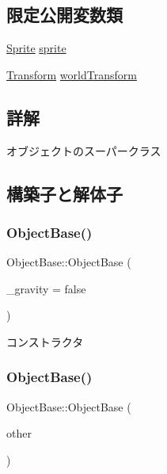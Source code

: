 \subsection*{限定公開変数類}
\begin{DoxyCompactItemize}
\item 
\mbox{\hyperlink{class_sprite}{Sprite}} \mbox{\hyperlink{class_object_base_a16415e349623e10f45518fb637f7051b}{sprite}}
\item 
\mbox{\hyperlink{common_8h_a1c43cb8f0d8a41901f3ce4c67dbbce20}{Transform}} \mbox{\hyperlink{class_object_base_abedc2ea4baa694611f8822ea6e04b210}{world\+Transform}}
\end{DoxyCompactItemize}


\subsection{詳解}
オブジェクトのスーパークラス 

\subsection{構築子と解体子}
\mbox{\label{class_object_base_a8567572c8f524465f9c70cabdb603637}} 
\subsubsection{\texorpdfstring{Object\+Base()}{ObjectBase()}\hspace{0.1cm}{\footnotesize\ttfamily [1/2]}}
{\footnotesize\ttfamily Object\+Base\+::\+Object\+Base (\begin{DoxyParamCaption}\item[{bool}]{\+\_\+gravity = {\ttfamily false} }\end{DoxyParamCaption})\hspace{0.3cm}{\ttfamily [inline]}}



コンストラクタ 

\mbox{\label{class_object_base_ace25225cee2f693b3b507a0ef6c19938}} 
\subsubsection{\texorpdfstring{Object\+Base()}{ObjectBase()}\hspace{0.1cm}{\footnotesize\ttfamily [2/2]}}
{\footnotesize\ttfamily Object\+Base\+::\+Object\+Base (\begin{DoxyParamCaption}\item[{const \mbox{\hyperlink{class_object_base}{Object\+Base}} \&}]{other }\end{DoxyParamCaption})\hspace{0.3cm}{\ttfamily [inline]}}



